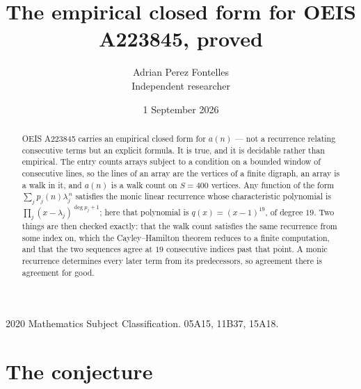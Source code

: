 \documentclass[11pt,a4paper]{article}
\title{The empirical closed form for OEIS A223845, proved}
\author{Adrian Perez Fontelles\\ \small Independent researcher}
\date{1 September 2026}
\theoremstyle{plain}
\theoremstyle{definition}
\begin{document}
\maketitle

\begin{abstract}
OEIS A223845 carries an empirical closed form for $a(n)$ --- not a recurrence relating
consecutive terms but an explicit formula. It is true, and it is decidable rather than
empirical. The entry counts arrays subject to a condition on a bounded window of consecutive lines, so the lines of an array are the
vertices of a finite digraph, an array is a walk in it, and $a(n)$ is a walk count on
$S=400$ vertices. Any function of the form $\sum_j p_j(n)\lambda_j^{\,n}$ satisfies the
monic linear recurrence whose characteristic polynomial is
$\prod_j(x-\lambda_j)^{\deg p_j+1}$; here that polynomial is $q(x)=(x-1)^{19}$, of degree
$19$. Two things are then checked exactly: that the walk count satisfies the same
recurrence from some index on, which the Cayley--Hamilton theorem reduces to a finite
computation, and that the two sequences agree at $19$ consecutive indices past that
point. A monic recurrence determines every later term from its predecessors, so agreement
there is agreement for good.
\end{abstract}

\noindent\small 2020 Mathematics Subject Classification. 05A15, 11B37, 15A18.\normalsize

\section{The conjecture}
\end{document}
